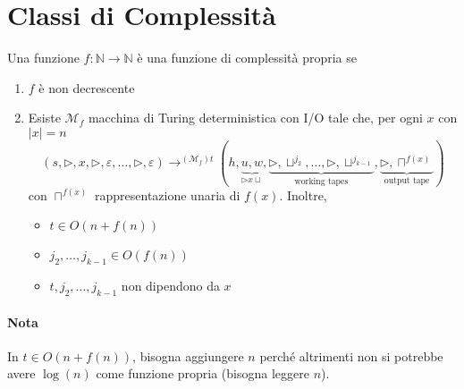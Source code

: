 \section{Classi di Complessità}

\begin{definition}
    Una funzione $f:\mathbb{N}\to\mathbb{N}$ è una funzione di complessità propria se
    \begin{enumerate}
        \item $f$ è non decrescente
        \item Esiste $\mathcal{M}_f$ macchina di Turing deterministica con I/O tale che, per ogni $x$ con $|x|=n$ 
        $$
            (s, \rhd, x, \rhd, \varepsilon, \dots, \rhd, \varepsilon) 
            \to^{(\mathcal{M}_f)t} 
            (h, 
            \underbrace{u,w}_{\rhd x\sqcup}, 
            \underbrace{\rhd,\sqcup^{j_2},\dots,\rhd,\sqcup^{j_{k-1}}}_{\text{working tapes}}, 
            \underbrace{\rhd,\sqcap^{f(x)}}_{\text{output tape}})
        $$
        con $\sqcap^{f(x)}$ rappresentazione unaria di $f(x)$. Inoltre,
        \begin{itemize}
            \item $t\in O(n+f(n))$
            \item $j_2,\dots,j_{k-1}\in O(f(n))$
            \item $t,j_2,\dots,j_{k-1}$ non dipendono da $x$
        \end{itemize}
    \end{enumerate}
\end{definition}
\paragraph{Nota} In $t\in O(n+f(n))$, bisogna aggiungere $n$ perché altrimenti non si potrebbe avere $\log(n)$ come funzione propria (bisogna leggere $n$).

